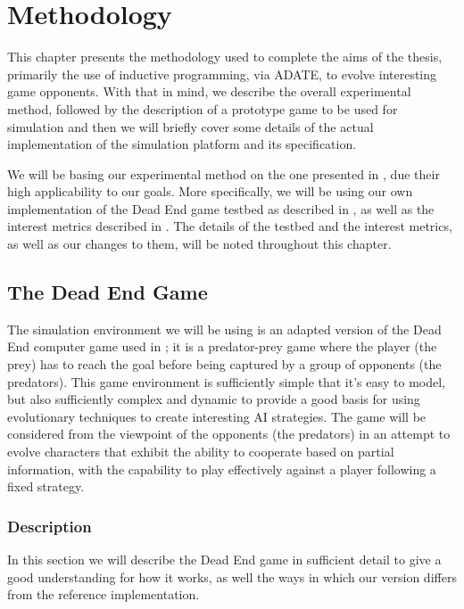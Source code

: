 \cleardoublepage
\chapter{Methodology}
\label{methodology}

This chapter presents the methodology used to complete the aims of the thesis,
primarily the use of inductive programming, via ADATE, to evolve interesting
game opponents. With that in mind, we describe the overall experimental method,
followed by the description of a prototype game to be used for simulation and
then we will briefly cover some details of the actual implementation of the
simulation platform and its specification.

We will be basing our experimental method on the one presented in
\citet{yannakakis2005ai}, due their high applicability to our goals. More
specifically, we will be using our own implementation of the Dead End game
testbed as described in \citet[Chap.~5]{yannakakis2005ai}, as well as the
interest metrics described in \citet[Chap.~2]{yannakakis2005ai}. The details of
the testbed and the interest metrics, as well as our changes to them, will be
noted throughout this chapter.

\section{The Dead End Game}
\label{sec:game}

The simulation environment we will be using is an adapted version of the Dead
End computer game used in \citet{yannakakis2005ai}; it is a predator-prey game
where the player (the prey) has to reach the goal before being captured by a
group of opponents (the predators). This game environment is sufficiently simple
that it's easy to model, but also sufficiently complex and dynamic to provide a
good basis for using evolutionary techniques to create interesting AI
strategies. The game will be considered from the viewpoint of the opponents (the
predators) in an attempt to evolve characters that exhibit the ability to
cooperate based on partial information, with the capability to play effectively
against a player following a fixed strategy.

\subsection{Description}
\label{sec:game-description}

In this section we will describe the Dead End game in sufficient detail to give
a good understanding for how it works, as well the ways in which our version
differs from the reference implementation.
\citep[see][Chap.~5]{yannakakis2005ai}

